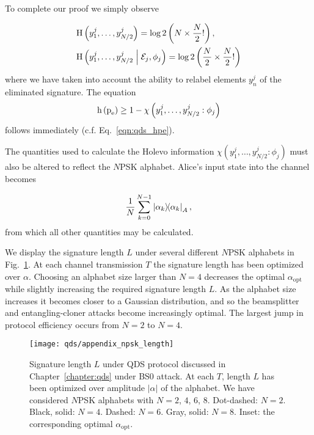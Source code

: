 To complete our proof we simply observe

\begin{align}
&\text{H}\left(y_1^j, \dots, y_{N/2}^j \right) = \log2 \left( N \times \frac{N}{2}!\right), \notag \\
%
&\text{H}\left(y_1^j, \dots, y_{N/2}^j \given \mathcal{E}_j, \phi_j\right) = \log2 \left( \frac{N}{2} \times \frac{N}{2}!\right)
\end{align}
where we have taken into account the ability to relabel elements $y_n^j$ of the eliminated signature. The equation
\begin{equation}
\text{h}\left(\text{p}_{\text{e}}\right) \ge 1 - \chi\left(y_1^j, \dots, y_{N/2}^j : \phi_j\right)
\end{equation} 
follows immediately (c.f. Eq.~\ref{eqn:qds_hpe}).

The quantities used to calculate the Holevo information $\chi\left(y_1^j, \dots, y_{N/2}^j : \phi_j\right)$ must also be altered to reflect the $N$PSK alphabet. Alice's input state into the channel becomes

\begin{equation}
\frac{1}{N} \sum_{k=0}^{N-1} \dyad{\alpha_k}_A,
\end{equation}
from which all other quantities may be calculated.

We display the signature length $L$ under several different $N$PSK alphabets in Fig.~\ref{fig:appendix_npsk_length}. At each channel transmission $T$ the signature length has been optimized over $\alpha$. Choosing an alphabet size larger than $N=4$ decreases the optimal $\alpha_{\text{opt}}$ while slightly increasing the required signature length $L$. As the alphabet size increases it becomes closer to a Gaussian distribution, and so the beamsplitter and entangling-cloner attacks become increasingly optimal. The largest jump in protocol efficiency occurs from $N=2$ to $N=4$.

\begin{figure}[htp]
\captionsetup{width=0.8\linewidth}
\centering
\texttt{[image: qds/appendix\_npsk\_length]}
\caption{\label{fig:appendix_npsk_length} Signature length $L$ under QDS protocol discussed in Chapter~\ref{chapter:qds} under BS$0$ attack. At each $T$, length $L$ has been optimized over amplitude $\left|\alpha\right|$ of the alphabet. We have considered $N$PSK alphabets with $N = 2$, $4$, $6$, $8$. Dot-dashed: $N=2$. Black, solid: $N = 4$. Dashed: $N = 6$. Gray, solid: $N = 8$. Inset: the corresponding optimal $\alpha_{\text{opt}}$. } %
\end{figure}




